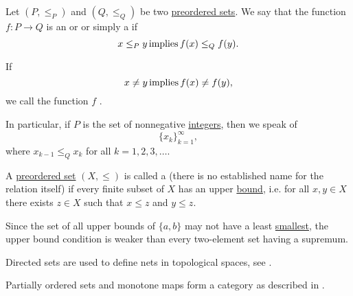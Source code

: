 \begin{definition}\label{def:monotone_map}
  Let \( (P, \leq_P) \) and \( (Q, \leq_Q) \) be two \hyperref[def:preordered_set]{preordered sets}. We say that the function \( f: P \to Q \) is an  or  or simply a  if
  \begin{equation*}
    x \leq_P y \mathop{\text{implies}} f(x) \leq_Q f(y).
  \end{equation*}

  If
  \begin{equation*}
    x \neq y \mathop{\text{implies}} f(x) \neq f(y),
  \end{equation*}
  we call the function \( f \) .

  In particular, if \( P \) is the set of nonnegative \hyperref[def:integers]{integers}, then we speak of 
  \begin{equation*}
    \{ x_k \}_{k=1}^\infty,
  \end{equation*}
  where \( x_{k-1} \leq_Q x_k \) for all \( k = 1, 2, 3, \ldots \).
\end{definition}

\begin{definition}\label{def:directed_set}\mcite\cite[8]{Engelking1989}
  A \hyperref[def:preordered_set]{preordered set} \( (X, \leq) \) is called a  (there is no established name for the relation itself) if every finite subset of \( X \) has an upper \hyperref[def:preordered_set/upper_lower_bound]{bound}, i.e. for all \( x, y \in X \) there exists \( z \in X \) such that \( x \leq z \) and \( y \leq z \).

  Since the set of all upper bounds of \( \{ a, b \} \) may not have a least \hyperref[def:preordered_set/largest_smallest_element]{smallest}, the upper bound condition is weaker than every two-element set having a supremum.

  Directed sets are used to define nets in topological spaces, see .
\end{definition}

\begin{definition}\label{def:category_of_preordered_sets}
  Partially ordered sets and monotone maps form a category as described in .
\end{definition}
